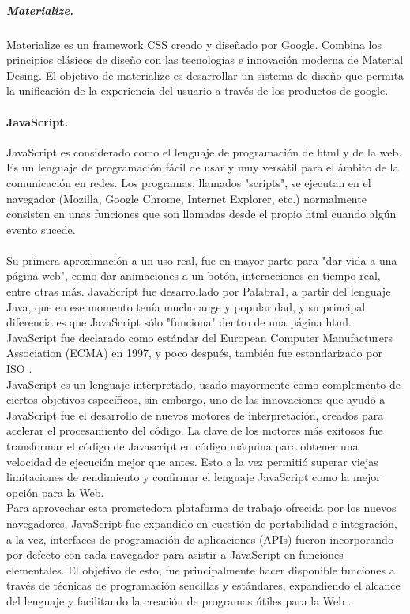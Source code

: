 \documentclass[12pt, a4paper, titlepage]{report}
\begin{document}
			
			\subparagraph{Materialize.\\}
			Materialize es un framework CSS creado y diseñado por Google. Combina los principios clásicos de diseño con las tecnologías e innovación moderna de Material Desing. El objetivo de materialize es desarrollar un sistema de diseño que permita la unificación de la experiencia del usuario a través de los productos de google.
			
			\paragraph {JavaScript. \\}
			JavaScript es considerado como el lenguaje de programación de html y de la web. Es un lenguaje de programación fácil de usar y muy versátil para el ámbito de la comunicación en redes. Los programas, llamados "scripts", se ejecutan en el navegador (Mozilla, Google Chrome, Internet Explorer, etc.) normalmente consisten en unas funciones que son llamadas desde el propio html cuando algún evento sucede.\\\\
			Su primera aproximación a un uso real, fue en mayor parte para "dar vida a una página web", como dar animaciones a un botón, interacciones en tiempo real, entre otras más. 
			JavaScript fue desarrollado por \Gls{Palabra1}, a partir del lenguaje Java, que en ese momento tenía mucho auge y popularidad, y su principal diferencia es que JavaScript sólo "funciona" dentro de una página html.\\
			JavaScript fue declarado como estándar del European Computer Manufacturers Association (ECMA) en 1997, y poco después, también fue estandarizado por ISO \cite{refJavaScript}. \\ 
			JavaScript es un lenguaje interpretado, usado mayormente como complemento de ciertos objetivos específicos, sin embargo, uno de las innovaciones que ayudó a JavaScript fue el desarrollo de nuevos motores de interpretación, creados para acelerar el procesamiento del código. La clave de los motores más exitosos fue transformar el código de Javascript en código máquina para obtener una velocidad de ejecución mejor que antes. Esto a la vez permitió superar viejas limitaciones de rendimiento y confirmar el lenguaje JavaScript como la mejor opción para la Web.\\
			
			Para aprovechar esta prometedora plataforma de trabajo ofrecida por los nuevos navegadores, JavaScript fue expandido en cuestión de portabilidad e integración, a la vez, interfaces de programación de aplicaciones (APIs) fueron incorporando por defecto con cada navegador para asistir a JavaScript en funciones elementales. El objetivo de esto, fue principalmente hacer disponible funciones a través de técnicas de programación sencillas y estándares, expandiendo el alcance del lenguaje y facilitando la creación de programas útiles para la Web \cite{refElGranLibro}.
			
\end{document}
